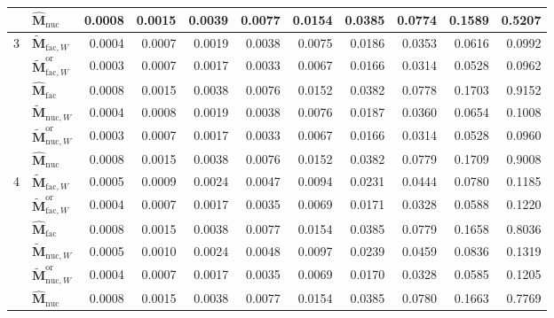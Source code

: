 \documentclass[numsec,webpdf,modern,large,namedate]{oup-authoring-template}
\theoremstyle{plain}
\theoremstyle{remark}
\newcommand{\M}{\bm{M}}
\begin{document}
\begin{table}[!htbp]
{\begin{tabular}{@{}llrrrrrrrrr@{}}
 & $\widehat{\M}_{\mathrm{nuc}}$ & 0.0008 & 0.0015 & 0.0039 & 0.0077 & 0.0154 & 0.0385 & 0.0774 & 0.1589 & 0.5207 \\
\midrule
\multirow{6}{*}{3} & $\widetilde{\M}_{\mathrm{fac},W}$ & 0.0004 & 0.0007 & 0.0019 & 0.0038 & 0.0075 & 0.0186 & 0.0353 & 0.0616 & 0.0992 \\
 & $\widetilde{\M}_{\mathrm{fac},W}^{\mathrm{or}}$ & 0.0003 & 0.0007 & 0.0017 & 0.0033 & 0.0067 & 0.0166 & 0.0314 & 0.0528 & 0.0962 \\
 & $\widehat{\M}_{\mathrm{fac}}$ & 0.0008 & 0.0015 & 0.0038 & 0.0076 & 0.0152 & 0.0382 & 0.0778 & 0.1703 & 0.9152 \\
 & $\widetilde{\M}_{\mathrm{nuc},W}$ & 0.0004 & 0.0008 & 0.0019 & 0.0038 & 0.0076 & 0.0187 & 0.0360 & 0.0654 & 0.1008 \\
 & $\widetilde{\M}_{\mathrm{nuc},W}^{\mathrm{or}}$ & 0.0003 & 0.0007 & 0.0017 & 0.0033 & 0.0067 & 0.0166 & 0.0314 & 0.0528 & 0.0960 \\
 & $\widehat{\M}_{\mathrm{nuc}}$ & 0.0008 & 0.0015 & 0.0038 & 0.0076 & 0.0152 & 0.0382 & 0.0779 & 0.1709 & 0.9008 \\
\midrule
\multirow{6}{*}{4} & $\widetilde{\M}_{\mathrm{fac},W}$ & 0.0005 & 0.0009 & 0.0024 & 0.0047 & 0.0094 & 0.0231 & 0.0444 & 0.0780 & 0.1185 \\
 & $\widetilde{\M}_{\mathrm{fac},W}^{\mathrm{or}}$ & 0.0004 & 0.0007 & 0.0017 & 0.0035 & 0.0069 & 0.0171 & 0.0328 & 0.0588 & 0.1220 \\
 & $\widehat{\M}_{\mathrm{fac}}$ & 0.0008 & 0.0015 & 0.0038 & 0.0077 & 0.0154 & 0.0385 & 0.0779 & 0.1658 & 0.8036 \\
 & $\widetilde{\M}_{\mathrm{nuc},W}$ & 0.0005 & 0.0010 & 0.0024 & 0.0048 & 0.0097 & 0.0239 & 0.0459 & 0.0836 & 0.1319 \\
 & $\widetilde{\M}_{\mathrm{nuc},W}^{\mathrm{or}}$ & 0.0004 & 0.0007 & 0.0017 & 0.0035 & 0.0069 & 0.0170 & 0.0328 & 0.0585 & 0.1205 \\
 & $\widehat{\M}_{\mathrm{nuc}}$ & 0.0008 & 0.0015 & 0.0038 & 0.0077 & 0.0154 & 0.0385 & 0.0780 & 0.1663 & 0.7769 \\
\bottomrule
\end{tabular}
}
\endgroup
\end{table}
\end{document}
